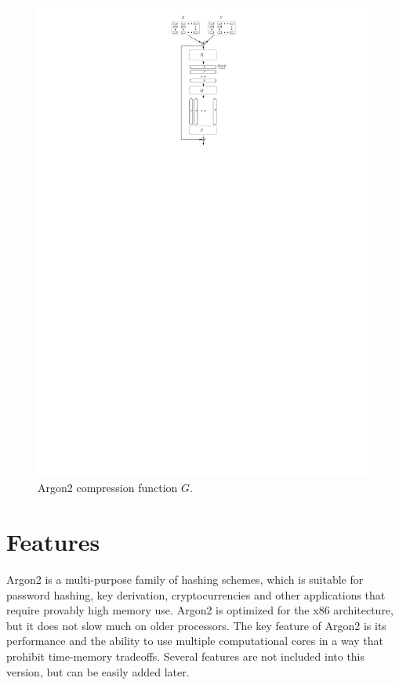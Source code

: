\documentclass[a4paper]{article}
\begin{document}
  \begin{figure}[ht]
  \ifpdf
\begin{center}
  \includegraphics[scale=0.6]{pics/compression.pdf}
  \caption{Argon2 compression function $G$. }\label{fig:compression}
\end{center}
\fi
  \end{figure}
  
  \section{Features}

\textsf{Argon2} is a multi-purpose family of  hashing schemes, which is suitable for password hashing, key derivation, cryptocurrencies and other applications that require provably high memory use. \textsf{Argon2} is optimized for the x86 architecture, but it does not slow much on older processors. The key feature of \textsf{Argon2} is its performance and the ability to use multiple computational cores in a way that prohibit time-memory tradeoffs. Several features are not included into this version, but can be easily added later.
\end{document}
